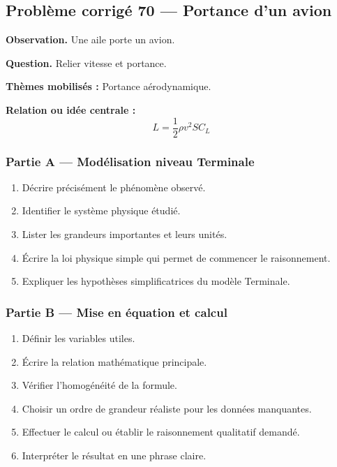 \documentclass[11pt,a4paper]{article}
\begin{document}
\subsection{Problème corrigé 70 — Portance d'un avion}

\begin{exercicebox}
\textbf{Observation.} Une aile porte un avion.

\medskip
\textbf{Question.} Relier vitesse et portance.

\medskip
\textbf{Thèmes mobilisés :} Portance aérodynamique.

\medskip
\textbf{Relation ou idée centrale :}
\[
L=\frac12\rho v^2SC_L
\]
\end{exercicebox}

\subsubsection*{Partie A — Modélisation niveau Terminale}

\begin{enumerate}
  \item Décrire précisément le phénomène observé.
  \item Identifier le système physique étudié.
  \item Lister les grandeurs importantes et leurs unités.
  \item Écrire la loi physique simple qui permet de commencer le raisonnement.
  \item Expliquer les hypothèses simplificatrices du modèle Terminale.
\end{enumerate}

\subsubsection*{Partie B — Mise en équation et calcul}

\begin{enumerate}
  \item Définir les variables utiles.
  \item Écrire la relation mathématique principale.
  \item Vérifier l'homogénéité de la formule.
  \item Choisir un ordre de grandeur réaliste pour les données manquantes.
  \item Effectuer le calcul ou établir le raisonnement qualitatif demandé.
  \item Interpréter le résultat en une phrase claire.
\end{enumerate}
\end{document}
